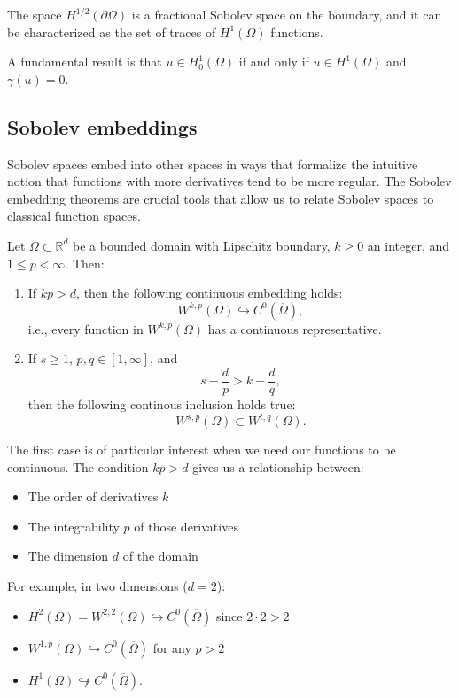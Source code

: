 The space $H^{1/2}(\partial\Omega)$ is a fractional Sobolev space on the boundary, and it can be characterized as the set of traces of $H^1(\Omega)$ functions.

A fundamental result is that $u \in H_0^1(\Omega)$ if and only if $u \in H^1(\Omega)$ and $\gamma(u) = 0$.

\subsection{Sobolev embeddings}

Sobolev spaces embed into other spaces in ways that formalize the intuitive notion that functions with more derivatives tend to be more regular. The Sobolev embedding theorems are crucial tools that allow us to relate Sobolev spaces to classical function spaces.

\begin{theorem}
Let $\Omega \subset \mathbb{R}^d$ be a bounded domain with Lipschitz boundary, $k \geq 0$ an integer, and $1 \leq p < \infty$. Then:

\begin{enumerate}
  \item If $kp > d$, then the following continuous embedding holds:
  \[
  W^{k,p}(\Omega) \hookrightarrow C^{0}(\overline{\Omega}),
  \]
  i.e., every function in $W^{k,p}(\Omega)$ has a continuous representative.
  
  \item If $s \geq 1$, $p,q \in [1, \infty]$, and 
  \[
  s - \frac{d}{p} > k - \frac{d}{q},
  \]
  then the following continous inclusion holds true:
  \[ 
    W^{s,p}(\Omega) \subset W^{t,q}(\Omega).
  \]
\end{enumerate}
\end{theorem}

The first case is of particular interest when we need our functions to be continuous. The condition $kp > d$ gives us a relationship between:

\begin{itemize}
  \item The order of derivatives $k$
  \item The integrability $p$ of those derivatives
  \item The dimension $d$ of the domain
\end{itemize}

For example, in two dimensions ($d=2$):
\begin{itemize}
  \item $H^2(\Omega) = W^{2,2}(\Omega) \hookrightarrow C^0(\overline{\Omega})$ since $2 \cdot 2 > 2$
  \item $W^{1,p}(\Omega) \hookrightarrow C^0(\overline{\Omega})$ for any $p > 2$
  \item $H^{1}(\Omega) \not\hookrightarrow C^0(\overline{\Omega})$.
\end{itemize}

